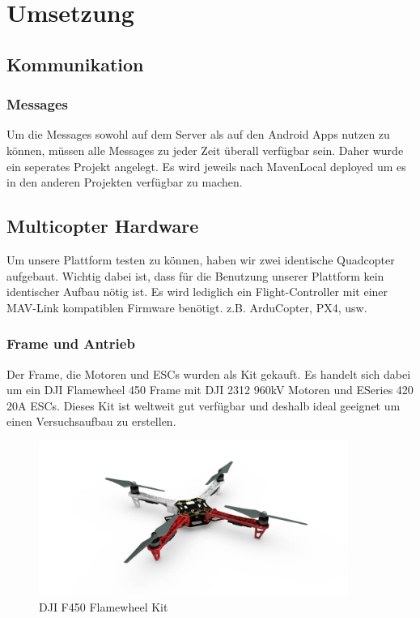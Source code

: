 \newpage
\chapter{Umsetzung}

\section{Kommunikation}

\subsection{Messages}
Um die Messages sowohl auf dem Server als auf den Android Apps nutzen zu können, müssen alle Messages zu jeder Zeit überall verfügbar sein. Daher wurde ein seperates Projekt angelegt. Es wird jeweils nach MavenLocal deployed um es in den anderen Projekten verfügbar zu machen.

\section{Multicopter Hardware}

Um unsere Plattform testen zu können, haben wir zwei identische Quadcopter aufgebaut.
Wichtig dabei ist, dass für die Benutzung unserer Plattform kein identischer Aufbau nötig ist. Es wird lediglich ein Flight-Controller mit einer MAV-Link kompatiblen Firmware benötigt. z.B. ArduCopter, PX4, usw. 

\subsection{Frame und Antrieb}

Der Frame, die Motoren und ESCs wurden als Kit gekauft. Es handelt sich dabei um ein DJI Flamewheel 450 Frame mit DJI 2312 960kV Motoren und ESeries 420 20A ESCs. Dieses Kit ist weltweit gut verfügbar und deshalb ideal geeignet um einen Versuchsaufbau zu erstellen.

\begin{figure}[h]
	\centering
	\includegraphics[width=0.9\textwidth] {images/hardware/f450.jpg} 
	\caption{DJI F450 Flamewheel Kit}
	\label{fig:f450}
\end{figure}


